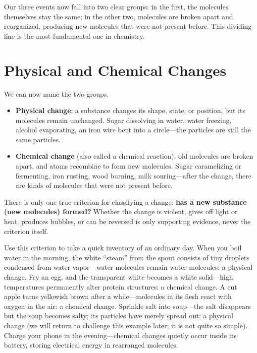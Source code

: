 Our three events now fall into two clear groups: in the first, the molecules themselves stay the same; in the other two, molecules are broken apart and reorganized, producing new molecules that were not present before. This dividing line is the most fundamental one in chemistry.

\section{Physical and Chemical Changes}

We can now name the two groups.

\begin{itemize}[itemsep=2pt]
\item \textbf{Physical change}: a substance changes its shape, state, or position, but its molecules remain unchanged. Sugar dissolving in water, water freezing, alcohol evaporating, an iron wire bent into a circle---the particles are still the same particles.
\item \textbf{Chemical change} (also called a chemical reaction): old molecules are broken apart, and atoms recombine to form new molecules. Sugar caramelizing or fermenting, iron rusting, wood burning, milk souring---after the change, there are kinds of molecules that were not present before.
\end{itemize}

There is only one true criterion for classifying a change: \textbf{has a new substance (new molecules) formed?} Whether the change is violent, gives off light or heat, produces bubbles, or can be reversed is only supporting evidence, never the criterion itself.

Use this criterion to take a quick inventory of an ordinary day. When you boil water in the morning, the white ``steam'' from the spout consists of tiny droplets condensed from water vapor---water molecules remain water molecules: a physical change. Fry an egg, and the transparent white becomes a white solid---high temperatures permanently alter protein structures: a chemical change. A cut apple turns yellowish brown after a while---molecules in its flesh react with oxygen in the air: a chemical change. Sprinkle salt into soup---the salt disappears but the soup becomes salty; its particles have merely spread out: a physical change (we will return to challenge this example later; it is not quite so simple). Charge your phone in the evening---chemical changes quietly occur inside its battery, storing electrical energy in rearranged molecules.

